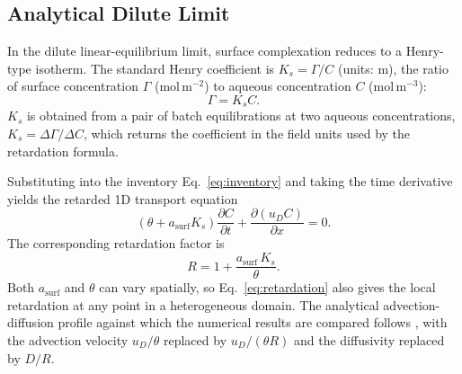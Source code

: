 \subsection{Analytical Dilute Limit}

In the dilute linear-equilibrium limit, surface complexation reduces to a
Henry-type isotherm. The standard Henry coefficient is $K_s = \Gamma / C$
(units: m), the ratio of surface concentration $\Gamma$ (mol\,m$^{-2}$) to
aqueous concentration $C$ (mol\,m$^{-3}$):
\begin{equation}
\Gamma = K_s C.
\end{equation}
$K_s$ is obtained from a pair of batch equilibrations at two aqueous
concentrations, $K_s = \Delta\Gamma / \Delta C$, which returns the coefficient
in the field units used by the retardation formula.

Substituting into the inventory Eq.~\eqref{eq:inventory} and taking the
time derivative yields the retarded 1D transport equation
\begin{equation}
\left(
\theta + a_{\mathrm{surf}}K_s
\right)\frac{\partial C}{\partial t}
+ \frac{\partial (u_D C)}{\partial x} = 0.
\end{equation}
The corresponding retardation factor is
\begin{equation}
R = 1 + \frac{a_{\mathrm{surf}}\,K_s}{\theta}.
\label{eq:retardation}
\end{equation}
Both $a_{\mathrm{surf}}$ and $\theta$ can vary spatially, so
Eq.~\eqref{eq:retardation} also gives the local retardation at any point in
a heterogeneous domain. The analytical advection-diffusion profile against
which the numerical results are compared follows \citet{ogata1961solution},
with the advection velocity $u_D/\theta$ replaced by $u_D/(\theta R)$
and the diffusivity replaced by $D/R$.
